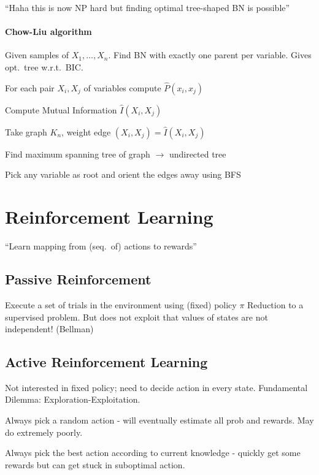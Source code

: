 \documentclass[a4paper, 10pt]{scrartcl}
\begin{document}
\begin{multicols*}{3}
``Haha this is now NP hard but finding optimal tree-shaped BN is possible''

\paragraph{Chow-Liu algorithm}
Given samples of $X_1,\dots,X_n$.
Find BN with exactly one parent per variable.
Gives opt.\ tree w.r.t.\ BIC.
\begin{compactitem}
	\item For each pair $X_i, X_j$ of variables compute $\hat{P}(x_i, x_j)$
	\item Compute Mutual Information $\hat{I}(X_i, X_j)$
	\item Take graph $K_n$, weight edge $(X_i,X_j) = \hat{I}(X_i, X_j)$
	\item Find maximum spanning tree of graph $\rightarrow$ undirected tree
	\item Pick any variable as root and orient the edges away using BFS
\end{compactitem}

\section{Reinforcement Learning}
``Learn mapping from (seq.\ of) actions to rewards''

\subsection{Passive Reinforcement}
Execute a set of trials in the environment using (fixed) policy  $\pi$
Reduction to a supervised problem. But does not exploit that values of states are not independent! (Bellman)

\subsection{Active Reinforcement Learning}
Not interested in fixed policy; need to decide action in every state. Fundamental Dilemma: Exploration-Exploitation.

\begin{compactitem}
	\item Always pick a random action - will eventually estimate all prob and rewards. May do extremely poorly. 
	\item Always pick the best action according to current knowledge - quickly get some rewards but can get stuck in suboptimal action.
\end{compactitem}


\end{multicols*}
\end{document}
